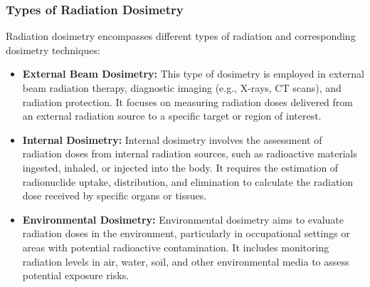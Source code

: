 \documentclass[../../Report.tex]{subfiles}
\begin{document}
    \subsubsection*{\large Types of Radiation Dosimetry}
        Radiation dosimetry encompasses different types of radiation and corresponding dosimetry techniques:
        \begin{itemize}
            \item \textbf{External Beam Dosimetry: } This type of dosimetry is employed in external beam radiation 
            therapy, diagnostic imaging (e.g., X-rays, CT scans), and radiation protection. It focuses on measuring 
            radiation doses delivered from an external radiation source to a specific target or region of interest.

            \item \textbf{Internal Dosimetry: } Internal dosimetry involves the assessment of radiation doses from 
            internal radiation sources, such as radioactive materials ingested, inhaled, or injected into the body. 
            It requires the estimation of radionuclide uptake, distribution, and elimination to calculate the radiation 
            dose received by specific organs or tissues.

            \item \textbf{Environmental Dosimetry: } Environmental dosimetry aims to evaluate radiation doses in the 
            environment, particularly in occupational settings or areas with potential radioactive contamination. It 
            includes monitoring radiation levels in air, water, soil, and other environmental media to assess potential 
            exposure risks.

        \end{itemize}
\end{document}
